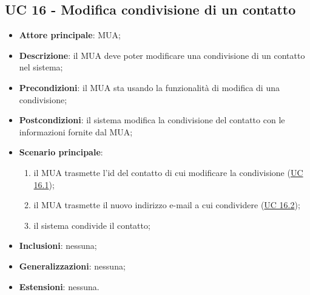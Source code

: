 \subsection{UC 16 - Modifica condivisione di un contatto} \label{sec:UC16}

    \begin{itemize}
        \item \textbf{Attore principale}: MUA;
        \item \textbf{Descrizione}: il MUA deve poter modificare una condivisione di un contatto nel sistema;
        \item \textbf{Precondizioni}: il MUA sta usando la funzionalità di modifica di una condivisione;
        \item \textbf{Postcondizioni}: il sistema modifica la condivisione del contatto con le informazioni fornite dal MUA;
        \item \textbf{Scenario principale}:
            \begin{enumerate}
                \item il MUA trasmette l'id del contatto di cui modificare la condivisione (\hyperref[sec:UC16.1]{UC 16.1});
                \item il MUA trasmette il nuovo indirizzo e-mail a cui condividere (\hyperref[sec:UC16.2]{UC 16.2});
                \item il sistema condivide il contatto;
            \end{enumerate}
        \item \textbf{Inclusioni}: nessuna;
        \item \textbf{Generalizzazioni}: nessuna;
        \item \textbf{Estensioni}: nessuna.
    \end{itemize}


